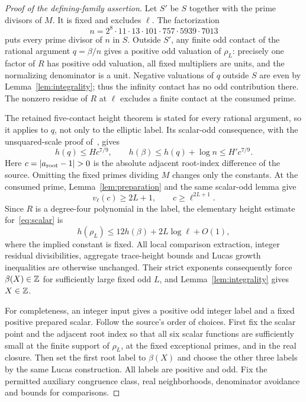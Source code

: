 \documentclass[11pt,a4paper]{article}
\begin{document}
\begin{proof}[Proof of the defining-family assertion]
Let $S'$ be $S$ together with the prime divisors of $M$.
It is fixed and excludes $\ell$. The factorization
\[
                  n=2^8\cdot11\cdot13\cdot101\cdot757\cdot5939\cdot7013
\]
puts every prime divisor of $n$ in $S$. Outside $S'$, any finite
odd contact of the rational argument $q=\beta/n$ gives a positive
odd valuation of $\rho_L$: precisely one factor of $R$ has positive
odd valuation, all fixed multipliers are units, and the normalizing
denominator is a unit. Negative valuations of $q$ outside $S$ are
even by Lemma~\ref{lem:integrality}; thus the infinity contact has
no odd contribution there. The nonzero residue of $R$ at $\ell$
excludes a finite contact at the consumed prime.

The retained five-contact height theorem is stated for every rational
argument, so it applies to $q$, not only to the elliptic label.
Its scalar-odd consequence, with the unsquared-scale proof
of~\cite{UnitNorm}, gives
\[
 h(q)\le Hc^{7/9},\qquad
 h(\beta)\le h(q)+\log n\le H'c^{7/9}.
\]
Here $c=|a_{\rm root}-1|>0$ is the absolute adjacent root-index difference of the source. Omitting the fixed
primes dividing $M$ changes only the constants. At the consumed prime,
Lemma~\ref{lem:preparation} and the same scalar-odd lemma give
\[
                        v_\ell(c)\ge2L+1,\qquad c\ge\ell^{2L+1}.
\]
Since $R$ is a degree-four polynomial in the label, the elementary
height estimate for~\eqref{eq:scalar} is
\[
                 h(\rho_L)\le12h(\beta)+2L\log\ell+O(1),
\]
where the implied constant is fixed. All local comparison extraction,
integer residual divisibilities, aggregate trace-height bounds and
Lucas growth inequalities are otherwise unchanged. Their strict
exponents consequently force $\beta(X)\in\mathbb Z$ for sufficiently large
fixed odd $L$, and Lemma~\ref{lem:integrality} gives $X\in\mathbb Z$.

For completeness, an integer input gives a positive odd integer label
and a fixed positive prepared scalar. Follow the source's order of
choices. First fix the scalar point and the adjacent root index so
that all six scalar functions are sufficiently small at the finite
support of $\rho_L$, at the fixed exceptional primes, and in the
real closure. Then set the first root label to $\beta(X)$ and choose
the other three labels by the same Lucas construction. All labels
are positive and odd. Fix the permitted auxiliary congruence class,
real neighborhoods, denominator avoidance and bounds for comparisons.


\end{proof}
\end{document}
